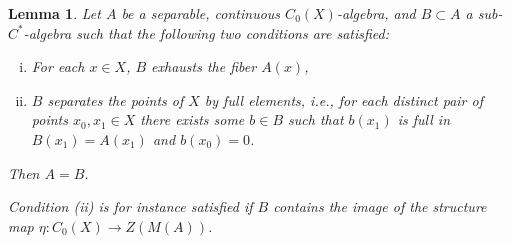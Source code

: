 \documentclass{amsart}
\newtheorem{lma}{Lemma}[section]
\theoremstyle{definition}
\begin{document}
\begin{lma}
\label{lma:fibered_subalg}
    Let $A$ be a separable, continuous $C_{0}(X)$-algebra, and $B\subset A$ a sub-{{$C^*$-al\-ge\-bra}}{} such that the following two conditions are satisfied:
    \begin{enumerate}[(i)]
        \item
        For each $x\in X$, $B$ exhausts the fiber $A(x)$,
        \item
        $B$ separates the points of $X$ by full elements, i.e., for each distinct pair of points $x_0,x_1\in X$ there exists some $b\in B$ such that $b(x_1)$ is full in $B(x_1)=A(x_1)$ and $b(x_0)=0$.
    \end{enumerate}
    Then $A=B$.

    Condition (ii) is for instance satisfied if $B$ contains the image of the structure map $\eta\colon C_0(X)\to Z(M(A))$.
\end{lma}
\end{document}
